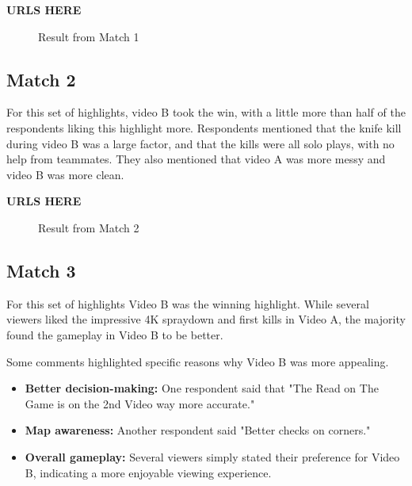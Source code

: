 \textbf{URLS HERE}
\begin{figure}
\centering
{}
\caption{Result from Match 1}
\label{fig:match1}
\end{figure}


\subsection{Match 2}
For this set of highlights, video B took the win, with a little more than half of the respondents liking this highlight more. Respondents mentioned that the knife kill during video B was a large factor, and that the kills were all solo plays, with no help from teammates. They also mentioned that video A was more messy and video B was more clean.


\textbf{URLS HERE}
\begin{figure}
\centering
{}
\caption{Result from Match 2}
\label{fig:match2}
\end{figure}
\subsection{Match 3}
For this set of highlights Video B was the winning highlight. While several viewers liked the impressive 4K spraydown and first kills in Video A, the majority found the gameplay in Video B to be better.

Some comments highlighted specific reasons why Video B was more appealing.

\begin{itemize}
\item \textbf{Better decision-making:} One respondent said that "The Read on The Game is on the 2nd Video way more accurate."
\item \textbf{Map awareness:} Another respondent said "Better checks on corners."
\item \textbf{Overall gameplay:} Several viewers simply stated their preference for Video B, indicating a more enjoyable viewing experience.
\end{itemize}

